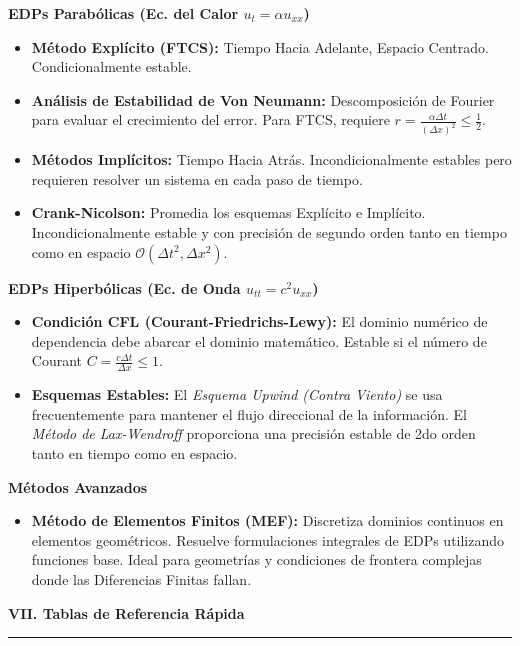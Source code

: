 \documentclass[10pt, landscape, twocolumn]{article}
\newcommand{\cheatsheetsection}[1]{
    \vspace{0.6em}
    {\color{themeblue}\large\bfseries #1} \par
    \vspace{-0.5em}
    {\color{themeblue}\rule{\linewidth}{1pt}} \par
    \vspace{0.2em}
}
\newcommand{\cheatsheetsubsection}[1]{
    \vspace{0.4em}
    {\color{themeblue}\normalsize\bfseries #1} \par
    \vspace{0.1em}
}
\begin{document}
\cheatsheetsubsection{EDPs Parabólicas (Ec. del Calor $u_t = \alpha u_{xx}$)}
\begin{itemize}[leftmargin=*, nosep]
    \item \textbf{Método Explícito (FTCS):} Tiempo Hacia Adelante, Espacio Centrado. Condicionalmente estable.
    \item \textbf{Análisis de Estabilidad de Von Neumann:} Descomposición de Fourier para evaluar el crecimiento del error. Para FTCS, requiere $r = \frac{\alpha \Delta t}{(\Delta x)^2} \leq \frac{1}{2}$.
    \item \textbf{Métodos Implícitos:} Tiempo Hacia Atrás. Incondicionalmente estables pero requieren resolver un sistema en cada paso de tiempo.
    \item \textbf{Crank-Nicolson:} Promedia los esquemas Explícito e Implícito. Incondicionalmente estable y con precisión de segundo orden tanto en tiempo como en espacio $\mathcal{O}(\Delta t^2, \Delta x^2)$.
\end{itemize}

\cheatsheetsubsection{EDPs Hiperbólicas (Ec. de Onda $u_{tt} = c^2 u_{xx}$)}
\begin{itemize}[leftmargin=*, nosep]
    \item \textbf{Condición CFL (Courant-Friedrichs-Lewy):} El dominio numérico de dependencia debe abarcar el dominio matemático. Estable si el número de Courant $C = \frac{c \Delta t}{\Delta x} \leq 1$.
    \item \textbf{Esquemas Estables:} El \textit{Esquema Upwind (Contra Viento)} se usa frecuentemente para mantener el flujo direccional de la información. El \textit{Método de Lax-Wendroff} proporciona una precisión estable de 2do orden tanto en tiempo como en espacio.
\end{itemize}

\cheatsheetsubsection{Métodos Avanzados}
\begin{itemize}[leftmargin=*, nosep]
    \item \textbf{Método de Elementos Finitos (MEF):} Discretiza dominios continuos en elementos geométricos. Resuelve formulaciones integrales de EDPs utilizando funciones base. Ideal para geometrías y condiciones de frontera complejas donde las Diferencias Finitas fallan.
\end{itemize}

\onecolumn
\raggedbottom

\cheatsheetsection{\LARGE VII. Tablas de Referencia Rápida}
\vspace{1em}
\end{document}
